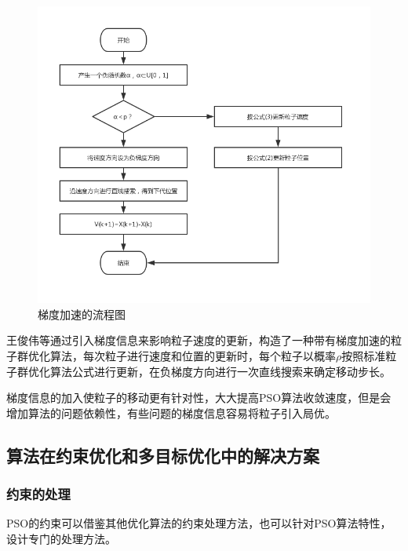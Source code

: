 \begin{figure}[ht]
	\centering
	\includegraphics[width=1.1\linewidth]{pic/tiduPSO}
	\caption{梯度加速的流程图}
	\label{figTidu}
\end{figure}

王俊伟\cite{Junwei2006Improved}等通过引入梯度信息来影响粒子速度的更新，构造了一种带有梯度加速的粒子群优化算法，每次粒子进行速度和位置的更新时，每个粒子以概率$\rho$按照标准粒子群优化算法公式进行更新，在负梯度方向进行一次直线搜索来确定移动步长。

梯度信息的加入使粒子的移动更有针对性，大大提高PSO算法收敛速度，但是会增加算法的问题依赖性，有些问题的梯度信息容易将粒子引入局优。

\subsection{算法在约束优化和多目标优化中的解决方案}
\subsubsection{约束的处理}
PSO的约束可以借鉴其他优化算法的约束处理方法，也可以针对PSO算法特性，设计专门的处理方法\cite{Higashi2013Particle}。

